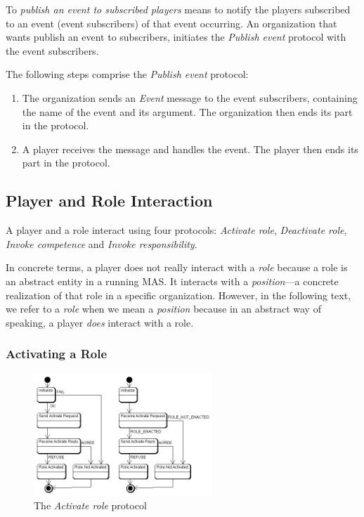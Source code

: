 To \textit{publish an event to subscribed players} means to notify the players subscribed to an event (event subscribers) of that event occurring.
An organization that wants publish an event to subscribers, initiates the \textit{Publish event} protocol with the event subscribers.

The following steps comprise the \textit{Publish event} protocol:
\begin{enumerate}
	\item The organization sends an \textit{Event} message to the event subscribers, containing the name of the event and its argument.
	The organization then ends its part in the protocol.
	\item A player receives the message and handles the event.
	The player then ends its part in the protocol.
\end{enumerate}

\subsection{Player and Role Interaction}

A player and a role interact using four protocols: \textit{Activate role}, \textit{Deactivate role}, \textit{Invoke competence} and \textit{Invoke responsibility}.

In concrete terms, a player does not really interact with a \textit{role} because a role is an abstract entity in a running MAS.
It interacts with a \textit{position}---a concrete realization of that role in a specific organization.
However, in the following text, we refer to a \textit{role} when we mean a \textit{position} because in an abstract way of speaking, a player \textit{does} interact with a role.

\subsubsection{Activating a Role}
\label{section:activating-a-role}

\begin{figure}[ht]
	\centering
	\includegraphics[width=0.6\textwidth]{images/thespian/activate-role-protocol.png}
	\caption{The \textit{Activate role} protocol}
	\label{figure:thespian-activate-role-protocol}
\end{figure}

